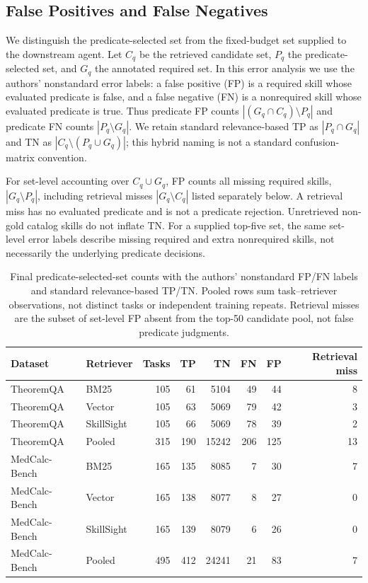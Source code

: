 \subsection{False Positives and False Negatives}
We distinguish the predicate-selected set from the fixed-budget set supplied to the downstream agent. Let $C_q$ be the retrieved candidate set, $P_q$ the predicate-selected set, and $G_q$ the annotated required set. In this error analysis we use the authors' nonstandard error labels: a false positive (FP) is a required skill whose evaluated predicate is false, and a false negative (FN) is a nonrequired skill whose evaluated predicate is true. Thus predicate FP counts $|(G_q\cap C_q)\setminus P_q|$ and predicate FN counts $|P_q\setminus G_q|$. We retain standard relevance-based TP as $|P_q\cap G_q|$ and TN as $|C_q\setminus(P_q\cup G_q)|$; this hybrid naming is not a standard confusion-matrix convention.

For set-level accounting over $C_q\cup G_q$, FP counts all missing required skills, $|G_q\setminus P_q|$, including retrieval misses $|G_q\setminus C_q|$ listed separately below. A retrieval miss has no evaluated predicate and is not a predicate rejection. Unretrieved non-gold catalog skills do not inflate TN. For a supplied top-five set, the same set-level error labels describe missing required and extra nonrequired skills, not necessarily the underlying predicate decisions.

\begin{table}[t]
\centering
\small
\begin{tabular}{llrrrrrr}
\toprule
Dataset & Retriever & Tasks & TP & TN & FN & FP & Retrieval miss \\
\midrule
TheoremQA & BM25 & 105 & 61 & 5104 & 49 & 44 & 8 \\
TheoremQA & Vector & 105 & 63 & 5069 & 79 & 42 & 3 \\
TheoremQA & SkillSight & 105 & 66 & 5069 & 78 & 39 & 2 \\
TheoremQA & Pooled & 315 & 190 & 15242 & 206 & 125 & 13 \\
MedCalc-Bench & BM25 & 165 & 135 & 8085 & 7 & 30 & 7 \\
MedCalc-Bench & Vector & 165 & 138 & 8077 & 8 & 27 & 0 \\
MedCalc-Bench & SkillSight & 165 & 139 & 8079 & 6 & 26 & 0 \\
MedCalc-Bench & Pooled & 495 & 412 & 24241 & 21 & 83 & 7 \\
\bottomrule
\end{tabular}
\caption{Final predicate-selected-set counts with the authors' nonstandard FP/FN labels and standard relevance-based TP/TN. Pooled rows sum task--retriever observations, not distinct tasks or independent training repeats. Retrieval misses are the subset of set-level FP absent from the top-50 candidate pool, not false predicate judgments.}
\label{tab:app-error-confusion}
\end{table}

